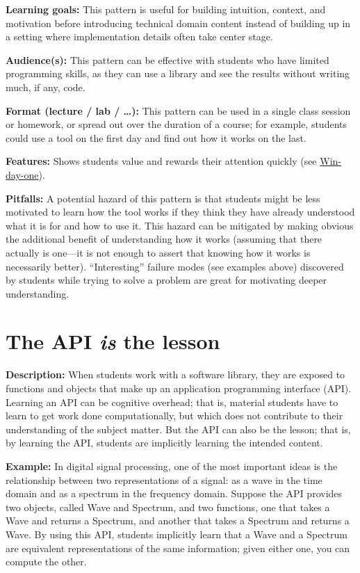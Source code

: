 \documentclass[]{book}
\begin{document}
\textbf{Learning goals:} This pattern is useful for building intuition,
context, and motivation before introducing technical domain content
instead of building up in a setting where implementation details often
take center stage.

\textbf{Audience(s):} This pattern can be effective with students who
have limited programming skills, as they can use a library and see the
results without writing much, if any, code.

\textbf{Format (lecture / lab / \ldots{}):} This pattern can be used in
a single class session or homework, or spread out over the duration of a
course; for example, students could use a tool on the first day and find
out how it works on the last.

\textbf{Features:} Shows students value and rewards their attention
quickly (see \protect\hyperlink{win-day-one}{Win-day-one}).

\textbf{Pitfalls:} A potential hazard of this pattern is that students
might be less motivated to learn how the tool works if they think they
have already understood what it is for and how to use it. This hazard
can be mitigated by making obvious the additional benefit of
understanding how it works (assuming that there actually is one---it is
not enough to assert that knowing how it works is necessarily better).
``Interesting'' failure modes (see examples above) discovered by
students while trying to solve a problem are great for motivating deeper
understanding.

\section{\texorpdfstring{The API \emph{is} the
lesson}{The API is the lesson}}\label{the-api-is-the-lesson}

\textbf{Description:} When students work with a software library, they
are exposed to functions and objects that make up an application
programming interface (API). Learning an API can be cognitive overhead;
that is, material students have to learn to get work done
computationally, but which does not contribute to their understanding of
the subject matter. But the API can also be the lesson; that is, by
learning the API, students are implicitly learning the intended content.

\textbf{Example:} In digital signal processing, one of the most
important ideas is the relationship between two representations of a
signal: as a wave in the time domain and as a spectrum in the frequency
domain. Suppose the API provides two objects, called Wave and Spectrum,
and two functions, one that takes a Wave and returns a Spectrum, and
another that takes a Spectrum and returns a Wave. By using this API,
students implicitly learn that a Wave and a Spectrum are equivalent
representations of the same information; given either one, you can
compute the other.
\end{document}
